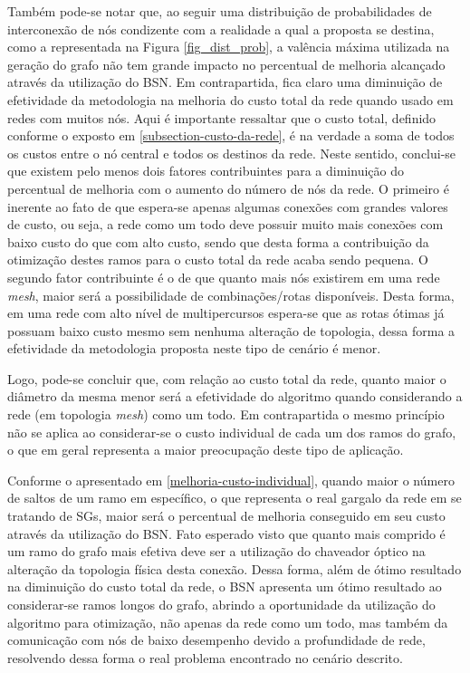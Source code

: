 Também pode-se notar que, ao seguir uma distribuição de probabilidades de interconexão de nós condizente com a realidade a qual a proposta se destina, como a representada na Figura \ref{fig_dist_prob}, a valência máxima utilizada na geração do grafo não tem grande impacto no percentual de melhoria alcançado através da utilização do BSN. Em contrapartida, fica claro uma diminuição de efetividade da metodologia na melhoria do custo total da rede quando usado em redes com muitos nós. Aqui é importante ressaltar que o custo total, definido conforme o exposto em \ref{subsection-custo-da-rede}, é na verdade a soma de todos os custos entre o nó central e todos os destinos da rede. Neste sentido, conclui-se que existem pelo menos dois fatores contribuintes para a diminuição do percentual de melhoria com o aumento do número de nós da rede. O primeiro é inerente ao fato de que espera-se apenas algumas conexões com grandes valores de custo, ou seja, a rede como um todo deve possuir muito mais conexões com baixo custo do que com alto custo, sendo que desta forma a contribuição da otimização destes ramos para o custo total da rede acaba sendo pequena. O segundo fator contribuinte é o de que quanto mais nós existirem em uma rede \emph{mesh}, maior será a possibilidade de combinações/rotas disponíveis. Desta forma, em uma rede com alto nível de multipercursos espera-se que as rotas ótimas já possuam baixo custo mesmo sem nenhuma alteração de topologia, dessa forma a efetividade da metodologia proposta neste tipo de cenário é menor.

Logo, pode-se concluir que, com relação ao custo total da rede, quanto maior o diâmetro da mesma menor será a efetividade do algoritmo quando considerando a rede (em topologia \emph{mesh}) como um todo. Em contrapartida o mesmo princípio não se aplica ao considerar-se o custo individual de cada um dos ramos do grafo, o que em geral representa a maior preocupação deste tipo de aplicação.

Conforme o apresentado em \ref{melhoria-custo-individual}, quando maior o número de saltos de um ramo em específico, o que representa o real gargalo da rede em se tratando de SGs, maior será o percentual de melhoria conseguido em seu custo através da utilização do BSN. Fato esperado visto que quanto mais comprido é um ramo do grafo mais efetiva deve ser a utilização do chaveador óptico na alteração da topologia física desta conexão. Dessa forma, além de ótimo resultado na diminuição do custo total da rede, o BSN apresenta um ótimo resultado ao considerar-se ramos longos do grafo, abrindo a oportunidade da utilização do algoritmo para otimização, não apenas da rede como um todo, mas também da comunicação com nós de baixo desempenho devido a profundidade de rede, resolvendo dessa forma o real problema encontrado no cenário descrito.

